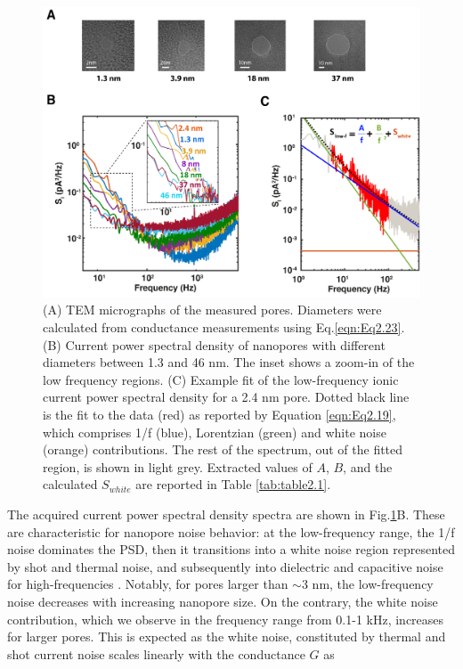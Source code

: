 \begin{figure}
	\includegraphics[width=0.95\linewidth]{figures/Figure2.2.png}
	\caption{(A) TEM micrographs of the measured pores. Diameters were calculated from conductance measurements using Eq.\ref{eqn:Eq2.23}. (B) Current power spectral density of nanopores with different diameters between 1.3 and 46 nm. The inset shows a zoom-in of the low frequency regions. (C) Example fit of the low-frequency ionic current power spectral density for a 2.4 nm pore. Dotted black line is the fit to the data (red) as reported by Equation \ref{eqn:Eq2.19}, which comprises 1/f (blue), Lorentzian (green) and white noise (orange) contributions. The rest of the spectrum, out of the fitted region, is shown in light grey. Extracted values of $A$, $B$, and the calculated $S_{white}$ are reported in Table \ref{tab:table2.1}.}
	\label{fig:fit}
\end{figure}

The acquired current power spectral density spectra are shown in Fig.\ref{fig:fit}B. These are characteristic for nanopore noise behavior: at the low-frequency range, the 1/f noise dominates the PSD, then it transitions into a white noise region represented by shot and thermal noise, and subsequently into dielectric and capacitive noise for high-frequencies \cite{Balan2014}. Notably, for pores larger than $\sim$3 nm, the low-frequency noise decreases with increasing nanopore size. On the contrary, the white noise contribution, which we observe in the frequency range from 0.1-1 kHz, increases for larger pores.  This is expected as the white noise, constituted by thermal and shot current noise scales linearly with the conductance $G$ as


